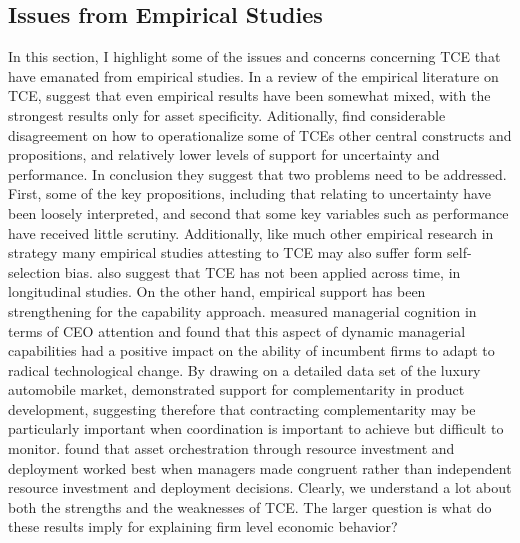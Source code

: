 \documentclass[12pt,letterpaper]{article}
\begin{document}
\subsection{Issues from Empirical Studies}
In this section, I highlight some of the issues and concerns concerning TCE that have emanated from empirical studies. In a review of the empirical literature on TCE, \cite{David2004} suggest that even empirical results have been somewhat mixed, with the strongest results only for asset specificity. Aditionally, \cite{David2004} find considerable disagreement on how to operationalize some of TCE\textquotesingle s other central constructs and propositions, and relatively lower levels of support for uncertainty and performance. In conclusion they suggest that two problems need to be addressed. First, some of the key propositions, including that relating to uncertainty have been loosely interpreted, and second that some key variables such as performance have received little scrutiny. Additionally, like much other empirical research in strategy many empirical studies attesting to TCE may also suffer form self-selection bias. \cite{David2004} also suggest that TCE has not been applied across time, in longitudinal studies. 
On the other hand, empirical support has been strengthening for the capability approach. \cite{Eggers2009} measured managerial cognition in terms of CEO attention and found that this aspect of dynamic managerial capabilities had a positive impact on the ability of incumbent firms to adapt to radical technological change. By drawing on a detailed data set of the luxury automobile market, \cite{Novak2009} demonstrated support for complementarity in product development, suggesting therefore that contracting complementarity may be particularly important when coordination is important to achieve but difficult to monitor. \cite{Sirmon2009} found that asset orchestration through resource investment and deployment worked best when managers made congruent rather than independent resource investment and deployment decisions. Clearly, we understand a lot about both the strengths and the weaknesses of TCE. The larger question is what do these results imply for explaining firm level economic behavior?
\end{document}
